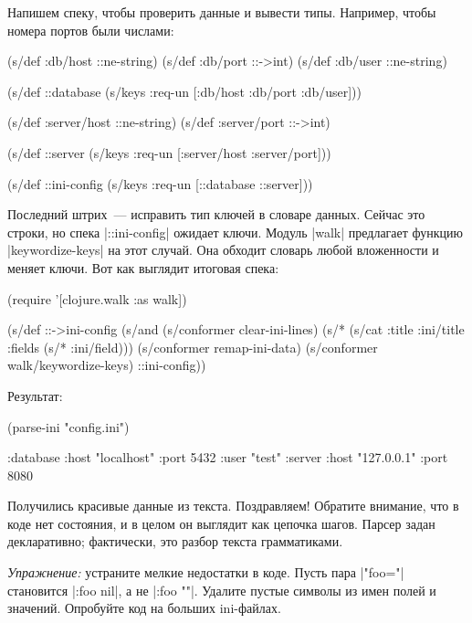 Напишем спеку, чтобы проверить данные и вывести типы. Например, чтобы номера
портов были числами:

\begin{english}
  \begin{clojure}
(s/def :db/host ::ne-string)
(s/def :db/port ::->int)
(s/def :db/user ::ne-string)

(s/def ::database
  (s/keys :req-un [:db/host :db/port :db/user]))

(s/def :server/host ::ne-string)
(s/def :server/port ::->int)

(s/def ::server
  (s/keys :req-un [:server/host :server/port]))

(s/def ::ini-config
  (s/keys :req-un [::database ::server]))
  \end{clojure}
\end{english}

Последний штрих~--- исправить тип ключей в словаре данных. Сейчас это строки, но
спека \spverb|::ini-config| ожидает ключи. Модуль \spverb|walk| предлагает
функцию \spverb|keywordize-keys| на этот случай. Она обходит словарь любой
вложенности и меняет ключи. Вот как выглядит итоговая спека:

\begin{english}
  \begin{clojure}
(require '[clojure.walk :as walk])

(s/def ::->ini-config
  (s/and
   (s/conformer clear-ini-lines)
   (s/* (s/cat :title :ini/title :fields (s/* :ini/field)))
   (s/conformer remap-ini-data)
   (s/conformer walk/keywordize-keys)
   ::ini-config))
  \end{clojure}
\end{english}

\noindent
Результат:

\begin{english}
  \begin{clojure}
(parse-ini "config.ini")

{:database {:host "localhost"
            :port 5432
            :user "test"}
 :server {:host "127.0.0.1"
          :port 8080}}
  \end{clojure}
\end{english}

Получились красивые данные из текста. Поздравляем! Обратите внимание, что в коде
нет состояния, и в целом он выглядит как цепочка шагов. Парсер задан
декларативно; фактически, это разбор текста грамматиками.

\emph{Упражнение:} устраните мелкие недостатки в коде. Пусть пара
\spverb|"foo="| становится \spverb|{:foo nil}|, а не \spverb|{:foo ""}|.
Удалите пустые символы из имен полей и значений. Опробуйте код на больших
ini-файлах.

